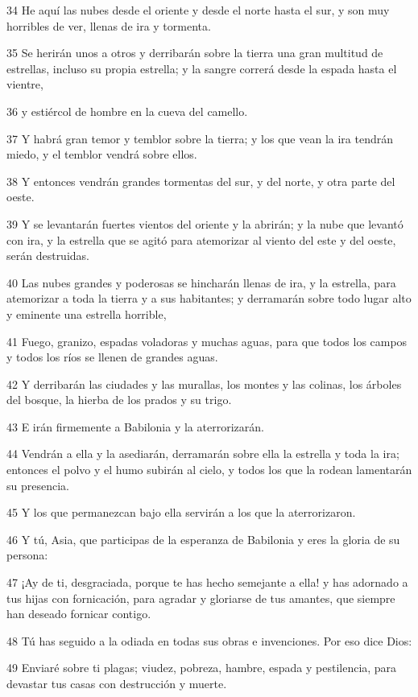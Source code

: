 \par 34 He aquí las nubes desde el oriente y desde el norte hasta el sur, y son muy horribles de ver, llenas de ira y tormenta.
\par 35 Se herirán unos a otros y derribarán sobre la tierra una gran multitud de estrellas, incluso su propia estrella; y la sangre correrá desde la espada hasta el vientre,
\par 36 y estiércol de hombre en la cueva del camello.
\par 37 Y habrá gran temor y temblor sobre la tierra; y los que vean la ira tendrán miedo, y el temblor vendrá sobre ellos.
\par 38 Y entonces vendrán grandes tormentas del sur, y del norte, y otra parte del oeste.
\par 39 Y se levantarán fuertes vientos del oriente y la abrirán; y la nube que levantó con ira, y la estrella que se agitó para atemorizar al viento del este y del oeste, serán destruidas.
\par 40 Las nubes grandes y poderosas se hincharán llenas de ira, y la estrella, para atemorizar a toda la tierra y a sus habitantes; y derramarán sobre todo lugar alto y eminente una estrella horrible,
\par 41 Fuego, granizo, espadas voladoras y muchas aguas, para que todos los campos y todos los ríos se llenen de grandes aguas.
\par 42 Y derribarán las ciudades y las murallas, los montes y las colinas, los árboles del bosque, la hierba de los prados y su trigo.
\par 43 E irán firmemente a Babilonia y la aterrorizarán.
\par 44 Vendrán a ella y la asediarán, derramarán sobre ella la estrella y toda la ira; entonces el polvo y el humo subirán al cielo, y todos los que la rodean lamentarán su presencia.
\par 45 Y los que permanezcan bajo ella servirán a los que la aterrorizaron.
\par 46 Y tú, Asia, que participas de la esperanza de Babilonia y eres la gloria de su persona:
\par 47 ¡Ay de ti, desgraciada, porque te has hecho semejante a ella! y has adornado a tus hijas con fornicación, para agradar y gloriarse de tus amantes, que siempre han deseado fornicar contigo.
\par 48 Tú has seguido a la odiada en todas sus obras e invenciones. Por eso dice Dios:
\par 49 Enviaré sobre ti plagas; viudez, pobreza, hambre, espada y pestilencia, para devastar tus casas con destrucción y muerte.
